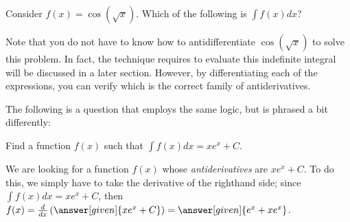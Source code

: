 \documentclass[nooutcomes]{ximera}
\begin{document}
\begin{question}
  Consider $f(x) = \cos(\sqrt{x})$. Which of the following is $\int f(x) dx$?  
  \begin{selectAll}
  \end{selectAll}
  
  \begin{feedback}
  Note that you do not have to know how to antidifferentiate
  $\cos\left(\sqrt{x}\right)$ to solve this problem.  In fact, the
  technique requires to evaluate this indefinite integral will be
  discussed in a later section. However, by differentiating each of
  the expressions, you can verify which is the correct family of
  antiderivatives.
  \end{feedback}
\end{question}

The following is a question that employs the same logic, but is phrased a bit differently:

\begin{example}
 Find a function $f(x)$ such that $\int f(x) dx = xe^x +C$.
  
  \begin{explanation}
    We are looking for a function $f(x)$ whose \emph{antiderivatives} are $xe^x +C$.  To do this, we simply have to take the derivative of the righthand side; since $\int f(x) dx =xe^x +C$, then $f(x) = \frac{d}{dx} \left(\answer[given]{xe^x +C}\right) =\answer[given]{e^x + xe^x}$.
    
    \end{explanation}
\end{example}



\end{document}
